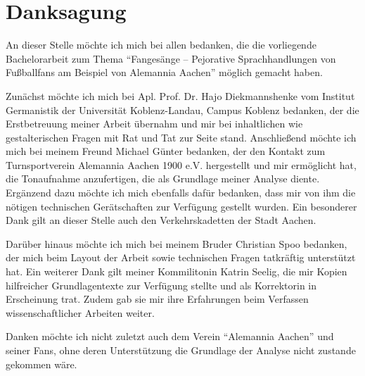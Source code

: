 \section{Danksagung}
An dieser Stelle möchte ich mich bei allen bedanken, die die vorliegende Bachelorarbeit zum Thema "`Fangesänge – Pejorative Sprachhandlungen von Fußballfans am
Beispiel von Alemannia Aachen"' möglich gemacht haben.

Zunächst möchte ich mich bei Apl. Prof. Dr. Hajo Diekmannshenke vom Institut Germanistik der Universität Koblenz-Landau, Campus Koblenz bedanken, der die Erstbetreuung meiner Arbeit übernahm und mir bei inhaltlichen wie gestalterischen Fragen mit Rat und Tat zur Seite stand.
Anschließend möchte ich mich bei meinem Freund Michael Günter bedanken, der den Kontakt zum Turnsportverein Alemannia Aachen 1900 e.V. hergestellt und mir ermöglicht hat, die Tonaufnahme anzufertigen, die als Grundlage meiner Analyse diente.
Ergänzend dazu möchte ich mich ebenfalls dafür bedanken, dass mir von ihm die nötigen technischen Gerätschaften zur Verfügung gestellt wurden. Ein besonderer Dank gilt an dieser Stelle auch den Verkehrskadetten der Stadt Aachen.

Darüber hinaus möchte ich mich bei meinem Bruder Christian Spoo bedanken, der mich beim Layout der Arbeit sowie technischen Fragen tatkräftig unterstützt hat.
Ein weiterer Dank gilt meiner Kommilitonin Katrin Seelig, die mir Kopien hilfreicher Grundlagentexte zur Verfügung stellte und als Korrektorin in Erscheinung trat.
Zudem gab sie mir ihre Erfahrungen beim Verfassen wissenschaftlicher Arbeiten weiter.

Danken möchte ich nicht zuletzt auch dem Verein "`Alemannia Aachen"' und seiner Fans, ohne deren Unterstützung die Grundlage der Analyse nicht zustande gekommen wäre.